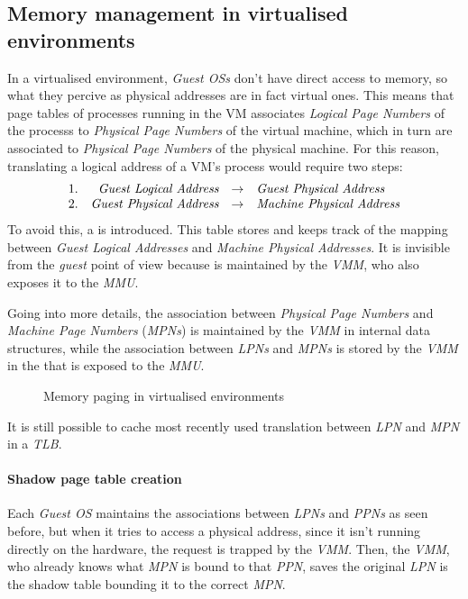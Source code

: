 \subsection{Memory management in virtualised environments}
In a virtualised environment, \emph{Guest OSs} don't have direct access to memory,
so what they percive as physical addresses are in fact virtual ones. This means
that page tables of processes running in the VM associates \emph{Logical Page
Numbers} of the processs to \emph{Physical Page Numbers} of the virtual machine,
which in turn are associated to \emph{Physical Page Numbers} of the physical
machine. For this reason, translating a logical address of a VM's process would
require two steps:
\[\begin{array}{lrcl}
    1. & \emph{Guest Logical Address} & \to & \emph{Guest Physical Address}\\
    2. & \emph{Guest Physical Address} & \to & \emph{Machine Physical Address}
\end{array}\]
To avoid this, a  is introduced. This table stores and keeps
track of the mapping between \emph{Guest Logical Addresses} and \emph{Machine
Physical Addresses}. It is invisible from the \emph{guest} point of view
because is maintained by the \emph{VMM}, who also exposes it to the \emph{MMU}.

Going into more details, the association between \emph{Physical Page Numbers}
and \emph{Machine Page Numbers} (\emph{MPNs}) is maintained by the \emph{VMM}
in internal data structures, while the association between \emph{LPNs} and
\emph{MPNs} is stored by the \emph{VMM} in the  that is
exposed to the \emph{MMU}.

\begin{figure}[h!]
    \centering
    \caption{Memory paging in virtualised environments}
\end{figure}

\noindent
It is still possible to cache most recently used translation between \emph{LPN}
and \emph{MPN} in a \emph{TLB}.

\paragraph{Shadow page table creation}
Each \emph{Guest OS} maintains the associations between \emph{LPNs} and
\emph{PPNs} as seen before, but when it tries to access a physical address,
since it isn't running directly on the hardware, the request is trapped by the
\emph{VMM}. Then, the \emph{VMM}, who already knows what \emph{MPN} is bound to
that \emph{PPN}, saves the original \emph{LPN} is the shadow table bounding it
to the correct \emph{MPN}.

